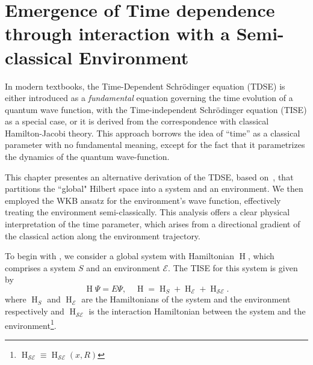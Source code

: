 \chapter[Time Emergence from Quantum-Classical Interactions
]{Emergence of Time dependence 
through interaction with a Semi-classical Environment\label{chap:briggs_rost_semiclassic}}

In modern textbooks, the Time-Dependent Schr\"odinger equation (TDSE) is either introduced as a \emph{fundamental}
equation governing the time evolution of a quantum wave function, with the Time-independent Schr\"odinger
equation (TISE) as a special case, or it is derived from the correspondence with classical Hamilton-Jacobi 
theory. This approach borrows the idea of ``time'' as a classical parameter with no fundamental 
meaning, except for the fact that it parametrizes the dynamics of the quantum wave-function. 

This chapter presentes an alternative derivation of the TDSE, based on~\cite{briggs2001derivation}, that partitions
the ``global" Hilbert space into a system and an environment. We then employed the WKB ansatz 
for the environment's wave function, effectively treating the environment semi-classically. 
This analysis offers a clear physical interpretation of the time parameter, which arises from a directional gradient of 
the classical action along the environment trajectory.

To begin with , we consider a global system with Hamiltonian $\operatorname{H}$, which comprises a system $S$ and an environment $\mathcal{E}$. 
The TISE for this system is given by
\begin{equation}
\label{eqn:chap2_TISE}
\operatorname{H}\Psi = E\Psi, \quad \operatorname{H} = \operatorname{H}_S + \operatorname{H}_{\mathcal{E}} + \operatorname{H}_{\mathcal{SE}}.
\end{equation}
where $\operatorname{H}_S$ and $\operatorname{H}_{\mathcal{E}}$ are the Hamiltonians of the system 
and the environment respectively and $\operatorname{H}_{\mathcal{SE}}$ is the interaction
Hamiltonian between the system and the environment\footnote{$\operatorname{H}_{\mathcal{SE}}\equiv \operatorname{H}_{\mathcal{SE}}(x, R)$}.

